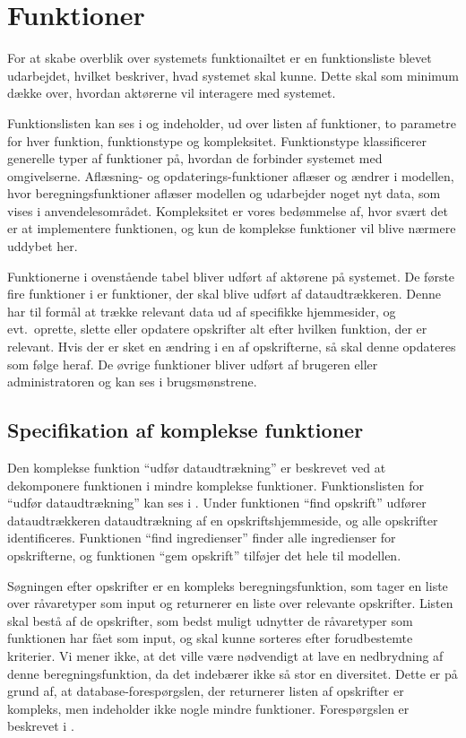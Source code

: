 \section{Funktioner}
\label{sec:funktioner}

For at skabe overblik over systemets funktionailtet er en funktionsliste  blevet udarbejdet, hvilket beskriver, hvad systemet skal kunne. Dette skal som minimum dække over, hvordan aktørerne vil interagere med systemet.

Funktionslisten kan ses i  og indeholder, ud over listen af funktioner, to parametre for hver funktion, funktionstype og kompleksitet. Funktionstype klassificerer generelle typer af funktioner på, hvordan de forbinder systemet med omgivelserne. Aflæsning- og opdaterings-funktioner aflæser og ændrer i modellen, hvor beregningsfunktioner aflæser modellen og udarbejder noget nyt data, som vises i anvendelesområdet. Kompleksitet er vores bedømmelse af, hvor svært det er at implementere funktionen, og kun de komplekse funktioner vil blive nærmere uddybet her.



Funktionerne i ovenstående tabel bliver udført af aktørene på systemet. De første fire funktioner i  er funktioner, der skal blive udført af dataudtrækkeren. Denne har til formål at trække relevant data ud af specifikke hjemmesider, og evt.\ oprette, slette eller opdatere opskrifter alt efter hvilken funktion, der er relevant. Hvis der \fx er sket en ændring i en af opskrifterne, så skal denne opdateres som følge heraf. De øvrige funktioner bliver udført af brugeren eller administratoren og kan ses i brugsmønstrene.

\subsection{Specifikation af komplekse funktioner}
Den komplekse funktion ``udfør dataudtrækning'' er beskrevet ved at dekomponere funktionen i mindre komplekse funktioner. Funktionslisten for ``udfør dataudtrækning'' kan ses i . Under funktionen ``find opskrift'' udfører dataudtrækkeren dataudtrækning af en opskriftshjemmeside, og alle opskrifter identificeres. Funktionen ``find ingredienser'' finder alle ingredienser for opskrifterne, og funktionen ``gem opskrift'' tilføjer det hele til modellen.



Søgningen efter opskrifter er en kompleks beregningsfunktion, som tager en liste over råvaretyper som input og returnerer en liste over relevante opskrifter. Listen skal bestå af de opskrifter, som bedst muligt udnytter de råvaretyper som funktionen har fået som input, og skal kunne sorteres efter forudbestemte kriterier. Vi mener ikke, at det ville være nødvendigt at lave en nedbrydning af denne beregningsfunktion, da det indebærer ikke så stor en diversitet. Dette er på grund af, at database-forespørgslen, der returnerer listen af opskrifter er kompleks, men indeholder ikke nogle mindre funktioner. Forespørgslen er beskrevet i .
